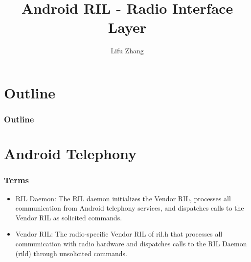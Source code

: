 \documentclass{beamer}
\title{Android RIL - Radio Interface Layer}
\institute{Elektrobit Wireless(2011)}
\author{Lifu Zhang}
\date{}
\begin{document}

\maketitle

\section*{Outline}
\begin{frame}
  \frametitle{Outline}
  \tableofcontents
\end{frame}

\section{Android Telephony}
\begin{frame}
    \frametitle{Terms}
    \begin{itemize}
        \item RIL Daemon: The RIL daemon initializes the Vendor RIL, processes all communication from Android telephony services, and dispatches calls to the Vendor RIL as solicited commands. 
        \item Vendor RIL: The radio-specific Vendor RIL of ril.h that processes all communication with radio hardware and dispatches calls to the RIL Daemon (rild) through unsolicited commands.
    \end{itemize}
\end{frame}
\end{document}
